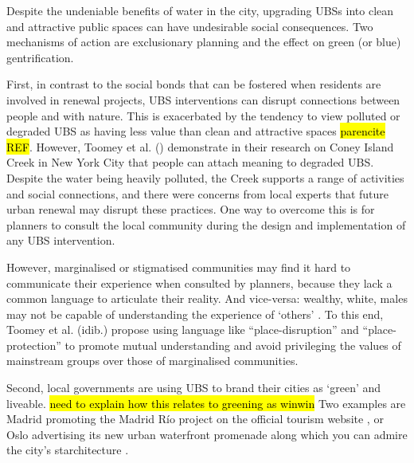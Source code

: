 \documentclass{article}
\begin{document}
Despite the undeniable benefits of water in the city, upgrading UBSs into clean and attractive public spaces can have undesirable social consequences.
Two mechanisms of action are exclusionary planning and the effect on green (or blue) gentrification.

First, in contrast to the social bonds that can be fostered when residents are involved in renewal projects, UBS interventions can disrupt connections between people and with nature.
This is exacerbated by the tendency to view polluted or degraded UBS as having less value than clean and attractive spaces \hl{parencite REF}. 
However, Toomey et al. (\citeyear{toomey2021place}) demonstrate in their research on Coney Island Creek in New York City that people can attach meaning to degraded UBS. Despite the water being heavily polluted, the Creek supports a range of activities and social connections, and there were concerns from local experts that future urban renewal may disrupt these practices. One way to overcome this is for planners to consult the local community during the design and implementation of any UBS intervention.

However, marginalised or stigmatised communities may find it hard to communicate their experience when consulted by planners, because they lack a common language to articulate their reality. And vice-versa: wealthy, white, males may not be capable of understanding the experience of `others' \parencite{anguelovski2020expanding}. To this end, Toomey et al. (idib.) propose using language like ``place-disruption'' and ``place-protection'' to promote mutual understanding and avoid privileging the values of mainstream groups over those of marginalised communities.

Second, local governments are using UBS to brand their cities as `green' and liveable.
\hl{need to explain how this relates to greening as winwin} Two examples are Madrid promoting the Madrid Río project on the official tourism website \parencite{madridrio}, or Oslo advertising its new urban waterfront promenade along which you can admire the city's starchitecture \parencite{visitoslo}.
\end{document}
